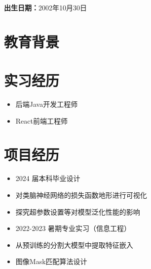 \documentclass{resume}
\begin{document}

\begin{center}
  \textbf{出生日期：}2002年10月30日
\end{center}

\section{教育背景}


\section{实习经历}

\begin{itemize}[parsep=0.5ex]
  \item 后端Java开发工程师
\end{itemize}

\begin{itemize}[parsep=0.5ex]
  \item React前端工程师
\end{itemize}

\section{项目经历}

\begin{itemize}[parsep=0.5ex]
  \item 2024 届本科毕业设计
  \item 对类脑神经网络的损失函数地形进行可视化
  \item 探究超参数设置等对模型泛化性能的影响
\end{itemize}

\begin{itemize}[parsep=0.5ex]
  \item 2022-2023 暑期专业实习（信息工程）
  \item 从预训练的分割大模型中提取特征嵌入
  \item 图像Mask匹配算法设计
\end{itemize}
\end{document}
